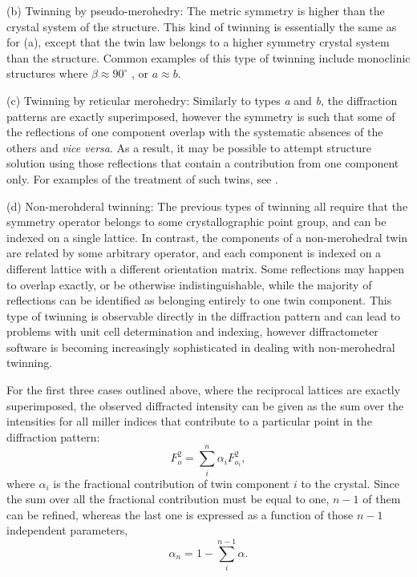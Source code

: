 \documentclass[pdf]{iucr}
\begin{document}
(b) Twinning by pseudo-merohedry: The metric symmetry is higher than the crystal system of the structure. This kind of twinning is essentially the same as for (a), except that the twin law belongs to a higher symmetry crystal system than the structure. Common examples of this type of twinning include monoclinic structures where $ \beta \approx 90^\circ $ , or $ a \approx b $.

(c) Twinning by reticular merohedry: Similarly to types \emph{a} and \emph{b}, the diffraction patterns are exactly superimposed, however the symmetry is such that some of the reflections of one component overlap with the systematic absences of the others and \emph{vice versa}. As a result, it may be possible to attempt structure solution using those reflections that contain a contribution from one component only. For examples of the treatment of such twins, see \cite{Herbst-Irmer:jz0014}.

(d) Non-merohderal twinning: The previous types of twinning all require that the symmetry operator belongs to some crystallographic point group, and can be indexed on a single lattice. In contrast, the components of a non-merohedral twin are related by some arbitrary operator, and each component is indexed on a different lattice with a different orientation matrix. Some reflections may happen to overlap exactly, or be otherwise indistinguishable, while the majority of reflections can be identified as belonging entirely to one twin component. This type of twinning is observable directly in the diffraction pattern and can lead to problems with unit cell determination and indexing, however diffractometer software is becoming increasingly sophisticated in dealing with non-merohedral twinning.

For the first three cases outlined above, where the reciprocal lattices are exactly superimposed, the observed diffracted intensity can be given as the sum over the intensities for all miller indices that contribute to a particular point in the diffraction pattern:
\begin{equation}
F_o^2 = \sum_i^{n}{\alpha_i F_{o_i}^2}
\label{eqn:twin_eq},
\end{equation}
where $\alpha_i$ is the fractional contribution of twin component $i$ to the crystal. Since the sum over all the fractional contribution must be equal to one, $n-1$ of them can be refined, whereas the last one is expressed as a function of those $n-1$ independent parameters,
\begin{equation}
\alpha_n = 1 - \sum_i^{n-1}{\alpha}
\label{eqn:twin_fractions}.
\end{equation}
\end{document}
